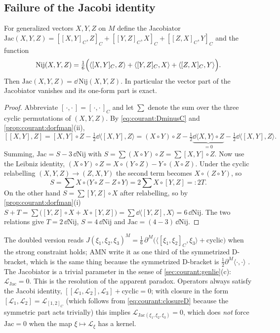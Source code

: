 \subsection{Failure of the Jacobi identity}

\begin{theorem}\label{thm:courant:jacobiator}
%
For generalized vectors $X,Y,Z$ on $M$ define the Jacobiator
$\mathrm{Jac}(X,Y,Z)=[[X,Y]_C,Z]_C+[[Y,Z]_C,X]_C+[[Z,X]_C,Y]_C$ and the function
\begin{equation}\label{eq:courant:nij}
\mathrm{Nij}(X,Y,Z)=\tfrac16\Bigl(\langle[X,Y]_C,Z\rangle+\langle[Y,Z]_C,X\rangle
+\langle[Z,X]_C,Y\rangle\Bigr).
\end{equation}
Then $\mathrm{Jac}(X,Y,Z)=\dd\,\mathrm{Nij}(X,Y,Z)$. In particular the vector part of the
Jacobiator vanishes and its one-form part is exact.
\end{theorem}
\begin{proof}
Abbreviate $[\,\cdot,\cdot\,]=[\,\cdot,\cdot\,]_C$ and let $\sum$ denote the sum over the three
cyclic permutations of $(X,Y,Z)$. By \eqref{eq:courant:DminusC} and
\cref{prop:courant:dorfman}(ii),
\[
[[X,Y],Z]=[X,Y]\circ Z-\tfrac12\dd\langle[X,Y],Z\rangle
=(X\circ Y)\circ Z-\tfrac12\underbrace{\dd\langle X,Y\rangle\circ Z}_{=0}
-\tfrac12\dd\langle[X,Y],Z\rangle .
\]
Summing, $\mathrm{Jac}=S-3\,\dd\mathrm{Nij}$ with $S=\sum(X\circ Y)\circ Z=\sum[X,Y]\circ Z$.
Now use the Leibniz identity, $(X\circ Y)\circ Z=X\circ(Y\circ Z)-Y\circ(X\circ Z)$. Under the
cyclic relabelling $(X,Y,Z)\to(Z,X,Y)$ the second term becomes $X\circ(Z\circ Y)$, so
\[
S=\sum X\circ\bigl(Y\circ Z-Z\circ Y\bigr)=2\sum X\circ[Y,Z]=:2T .
\]
On the other hand $S=\sum[Y,Z]\circ X$ after relabelling, so by
\cref{prop:courant:dorfman}(i)
$S+T=\sum\bigl([Y,Z]\circ X+X\circ[Y,Z]\bigr)=\sum\dd\langle[Y,Z],X\rangle=6\,\dd\mathrm{Nij}$.
The two relations give $T=2\,\dd\mathrm{Nij}$, $S=4\,\dd\mathrm{Nij}$ and
$\mathrm{Jac}=(4-3)\,\dd\mathrm{Nij}$.
\end{proof}

The doubled version reads $J(\xi_1,\xi_2,\xi_3)^M=\tfrac16\,\partial^M\bigl(
\langle[\xi_1,\xi_2]_C,\xi_3\rangle+\text{cyclic}\bigr)$ when the strong constraint holds; AMN
write it as one third of the symmetrized D-bracket, which is the same thing because the
symmetrized D-bracket is $\tfrac12\partial^M\langle\cdot,\cdot\rangle$ . The Jacobiator is a trivial parameter in the sense of
\cref{sec:courant:genlie}(c): $\mathcal L_{\mathrm{Jac}}=0$. This is the resolution of the apparent
paradox. Operators always satisfy the Jacobi identity,
$[[\mathcal L_1,\mathcal L_2],\mathcal L_3]+\text{cyclic}=0$; with closure in the form
$[\mathcal L_1,\mathcal L_2]=\mathcal L_{[1,2]_C}$ (which follows from \eqref{eq:courant:closureD}
because the symmetric part acts trivially) this implies $\mathcal L_{\mathrm{Jac}(\xi_1,\xi_2,\xi_3)}=0$, which does
\emph{not} force $\mathrm{Jac}=0$ when the map $\xi\mapsto\mathcal L_\xi$ has a kernel.

